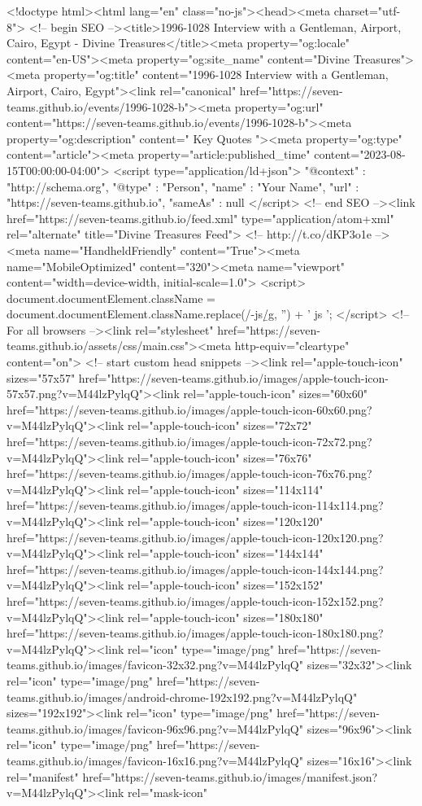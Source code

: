 <!doctype html><html lang="en" class="no-js"><head><meta charset="utf-8"> <!-- begin SEO --><title>1996-1028 Interview with a Gentleman, Airport, Cairo, Egypt - Divine Treasures</title><meta property="og:locale" content="en-US"><meta property="og:site_name" content="Divine Treasures"><meta property="og:title" content="1996-1028 Interview with a Gentleman, Airport, Cairo, Egypt"><link rel="canonical" href="https://seven-teams.github.io/events/1996-1028-b"><meta property="og:url" content="https://seven-teams.github.io/events/1996-1028-b"><meta property="og:description" content=" Key Quotes "><meta property="og:type" content="article"><meta property="article:published_time" content="2023-08-15T00:00:00-04:00"> <script type="application/ld+json"> { "@context" : "http://schema.org", "@type" : "Person", "name" : "Your Name", "url" : "https://seven-teams.github.io", "sameAs" : null } </script> <!-- end SEO --><link href="https://seven-teams.github.io/feed.xml" type="application/atom+xml" rel="alternate" title="Divine Treasures Feed"> <!-- http://t.co/dKP3o1e --><meta name="HandheldFriendly" content="True"><meta name="MobileOptimized" content="320"><meta name="viewport" content="width=device-width, initial-scale=1.0"> <script> document.documentElement.className = document.documentElement.className.replace(/\bno-js\b/g, '') + ' js '; </script> <!-- For all browsers --><link rel="stylesheet" href="https://seven-teams.github.io/assets/css/main.css"><meta http-equiv="cleartype" content="on"> <!-- start custom head snippets --><link rel="apple-touch-icon" sizes="57x57" href="https://seven-teams.github.io/images/apple-touch-icon-57x57.png?v=M44lzPylqQ"><link rel="apple-touch-icon" sizes="60x60" href="https://seven-teams.github.io/images/apple-touch-icon-60x60.png?v=M44lzPylqQ"><link rel="apple-touch-icon" sizes="72x72" href="https://seven-teams.github.io/images/apple-touch-icon-72x72.png?v=M44lzPylqQ"><link rel="apple-touch-icon" sizes="76x76" href="https://seven-teams.github.io/images/apple-touch-icon-76x76.png?v=M44lzPylqQ"><link rel="apple-touch-icon" sizes="114x114" href="https://seven-teams.github.io/images/apple-touch-icon-114x114.png?v=M44lzPylqQ"><link rel="apple-touch-icon" sizes="120x120" href="https://seven-teams.github.io/images/apple-touch-icon-120x120.png?v=M44lzPylqQ"><link rel="apple-touch-icon" sizes="144x144" href="https://seven-teams.github.io/images/apple-touch-icon-144x144.png?v=M44lzPylqQ"><link rel="apple-touch-icon" sizes="152x152" href="https://seven-teams.github.io/images/apple-touch-icon-152x152.png?v=M44lzPylqQ"><link rel="apple-touch-icon" sizes="180x180" href="https://seven-teams.github.io/images/apple-touch-icon-180x180.png?v=M44lzPylqQ"><link rel="icon" type="image/png" href="https://seven-teams.github.io/images/favicon-32x32.png?v=M44lzPylqQ" sizes="32x32"><link rel="icon" type="image/png" href="https://seven-teams.github.io/images/android-chrome-192x192.png?v=M44lzPylqQ" sizes="192x192"><link rel="icon" type="image/png" href="https://seven-teams.github.io/images/favicon-96x96.png?v=M44lzPylqQ" sizes="96x96"><link rel="icon" type="image/png" href="https://seven-teams.github.io/images/favicon-16x16.png?v=M44lzPylqQ" sizes="16x16"><link rel="manifest" href="https://seven-teams.github.io/images/manifest.json?v=M44lzPylqQ"><link rel="mask-icon" 